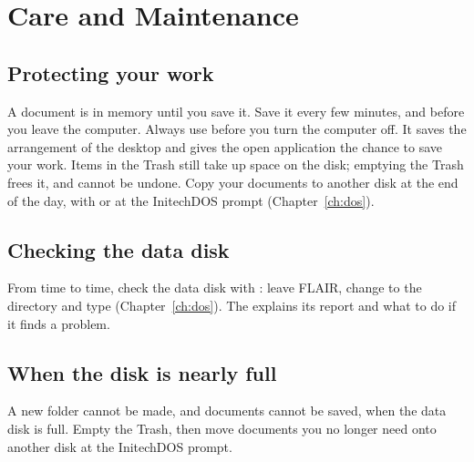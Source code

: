 \chapter{Care and Maintenance}
\label{ch:care}

\section{Protecting your work}
A document is in memory until you save it.  Save it every
few minutes, and before you leave the computer.
Always use  before you turn the
computer off.  It saves the arrangement of the desktop and gives the open
application the chance to save your work.
Items in the Trash still take up space
on the disk; emptying the Trash frees it, and cannot be undone.
Copy your documents to another disk at the end of the
day, with  or  at the InitechDOS prompt
(Chapter~\ref{ch:dos}).

\section{Checking the data disk}
From time to time, check the data disk with : leave FLAIR,
change to the  directory and type  (Chapter~\ref{ch:dos}).
The  explains its report and what to do if
it finds a problem.

\section{When the disk is nearly full}
A new folder cannot be made, and documents cannot be saved, when the data
disk is full.  Empty the Trash, then move documents you no longer need
onto another disk at the InitechDOS prompt.

